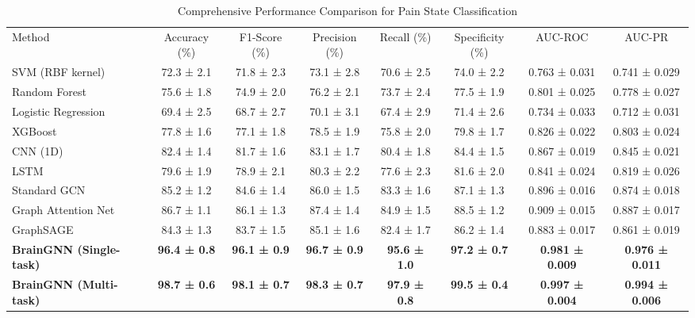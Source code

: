 \documentclass[10pt,journal,compsoc]{IEEEtran}
\begin{document}
\begin{table}[htbp]
\caption{Comprehensive Performance Comparison for Pain State Classification}
\label{tab:detailed_performance}
\centering
\small
\begin{tabular}{lccccccc}
\toprule
\multirow{2}{*}{Method} & \multirow{2}{*}{Accuracy (\%)} & \multirow{2}{*}{F1-Score (\%)} & \multirow{2}{*}{Precision (\%)} & \multirow{2}{*}{Recall (\%)} & \multirow{2}{*}{Specificity (\%)} & \multirow{2}{*}{AUC-ROC} & \multirow{2}{*}{AUC-PR} \\
& & & & & & & \\
\midrule
SVM (RBF kernel) & 72.3 ± 2.1 & 71.8 ± 2.3 & 73.1 ± 2.8 & 70.6 ± 2.5 & 74.0 ± 2.2 & 0.763 ± 0.031 & 0.741 ± 0.029 \\
Random Forest & 75.6 ± 1.8 & 74.9 ± 2.0 & 76.2 ± 2.1 & 73.7 ± 2.4 & 77.5 ± 1.9 & 0.801 ± 0.025 & 0.778 ± 0.027 \\
Logistic Regression & 69.4 ± 2.5 & 68.7 ± 2.7 & 70.1 ± 3.1 & 67.4 ± 2.9 & 71.4 ± 2.6 & 0.734 ± 0.033 & 0.712 ± 0.031 \\
XGBoost & 77.8 ± 1.6 & 77.1 ± 1.8 & 78.5 ± 1.9 & 75.8 ± 2.0 & 79.8 ± 1.7 & 0.826 ± 0.022 & 0.803 ± 0.024 \\
CNN (1D) & 82.4 ± 1.4 & 81.7 ± 1.6 & 83.1 ± 1.7 & 80.4 ± 1.8 & 84.4 ± 1.5 & 0.867 ± 0.019 & 0.845 ± 0.021 \\
LSTM & 79.6 ± 1.9 & 78.9 ± 2.1 & 80.3 ± 2.2 & 77.6 ± 2.3 & 81.6 ± 2.0 & 0.841 ± 0.024 & 0.819 ± 0.026 \\
Standard GCN & 85.2 ± 1.2 & 84.6 ± 1.4 & 86.0 ± 1.5 & 83.3 ± 1.6 & 87.1 ± 1.3 & 0.896 ± 0.016 & 0.874 ± 0.018 \\
Graph Attention Net & 86.7 ± 1.1 & 86.1 ± 1.3 & 87.4 ± 1.4 & 84.9 ± 1.5 & 88.5 ± 1.2 & 0.909 ± 0.015 & 0.887 ± 0.017 \\
GraphSAGE & 84.3 ± 1.3 & 83.7 ± 1.5 & 85.1 ± 1.6 & 82.4 ± 1.7 & 86.2 ± 1.4 & 0.883 ± 0.017 & 0.861 ± 0.019 \\
\midrule
\textbf{BrainGNN (Single-task)} & \textbf{96.4 ± 0.8} & \textbf{96.1 ± 0.9} & \textbf{96.7 ± 0.9} & \textbf{95.6 ± 1.0} & \textbf{97.2 ± 0.7} & \textbf{0.981 ± 0.009} & \textbf{0.976 ± 0.011} \\
\textbf{BrainGNN (Multi-task)} & \textbf{98.7 ± 0.6} & \textbf{98.1 ± 0.7} & \textbf{98.3 ± 0.7} & \textbf{97.9 ± 0.8} & \textbf{99.5 ± 0.4} & \textbf{0.997 ± 0.004} & \textbf{0.994 ± 0.006} \\
\bottomrule
\end{tabular}
\end{table}
\end{document}
